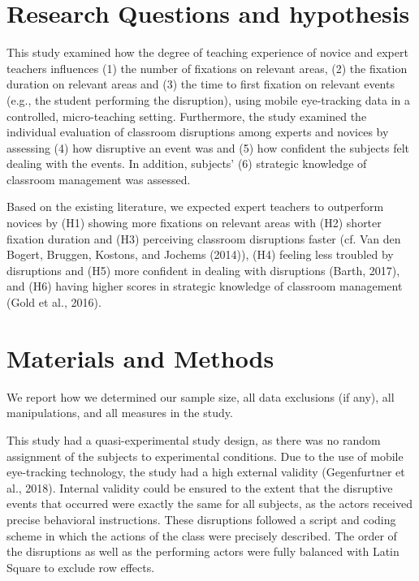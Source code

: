 \documentclass[
  man]{apa6}
\begin{document}
\hypertarget{research-questions-and-hypothesis}{%
\section{Research Questions and hypothesis}\label{research-questions-and-hypothesis}}

This study examined how the degree of teaching experience of novice and expert teachers influences (1) the number of fixations on relevant areas, (2) the fixation duration on relevant areas and (3) the time to first fixation on relevant events (e.g., the student performing the disruption), using mobile eye-tracking data in a controlled, micro-teaching setting. Furthermore, the study examined the individual evaluation of classroom disruptions among experts and novices by assessing (4) how disruptive an event was and (5) how confident the subjects felt dealing with the events. In addition, subjects' (6) strategic knowledge of classroom management was assessed.

Based on the existing literature, we expected expert teachers to outperform novices by (H1) showing more fixations on relevant areas with (H2) shorter fixation duration and (H3) perceiving classroom disruptions faster (cf. Van den Bogert, Bruggen, Kostons, and Jochems (2014)), (H4) feeling less troubled by disruptions and (H5) more confident in dealing with disruptions (Barth, 2017), and (H6) having higher scores in strategic knowledge of classroom management (Gold et al., 2016).

\hypertarget{materials-and-methods}{%
\section{Materials and Methods}\label{materials-and-methods}}

We report how we determined our sample size, all data exclusions (if any), all manipulations, and all measures in the study.

This study had a quasi-experimental study design, as there was no random assignment of the subjects to experimental conditions. Due to the use of mobile eye-tracking technology, the study had a high external validity (Gegenfurtner et al., 2018). Internal validity could be ensured to the extent that the disruptive events that occurred were exactly the same for all subjects, as the actors received precise behavioral instructions. These disruptions followed a script and coding scheme in which the actions of the class were precisely described. The order of the disruptions as well as the performing actors were fully balanced with Latin Square to exclude row effects.
\end{document}
